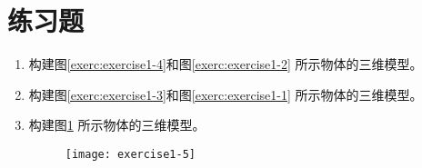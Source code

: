 \section*{练习题}
\begin{enumerate}
\item 
\begin{question}
构建图\ref{exerc:exercise1-4}和图\ref{exerc:exercise1-2}  所示物体的三维模型。
\begin{figure}[htbp]
\centering
\begin{floatrow}[2]
\end{floatrow}
\end{figure}
\end{question}

\item 
\begin{question}
构建图\ref{exerc:exercise1-3}和图\ref{exerc:exercise1-1}  所示物体的三维模型。
\begin{figure}[htbp]
\centering
\begin{floatrow}[2]
\end{floatrow}
\end{figure}
\end{question}

\item 
\begin{question}
构建图\ref{exerc:exercise1-5} 所示物体的三维模型。
\begin{figure}[htbp]
\centering
\texttt{[image: exercise1-5]}
\caption{ }\label{exerc:exercise1-5}
\end{figure}
\end{question}
\end{enumerate}
\endinput